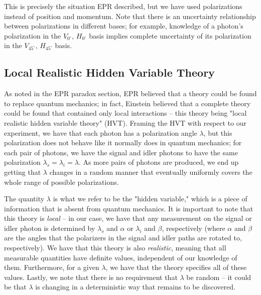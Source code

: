 \documentclass[twocolumn,amsmath,amssymb,pra]{revtex4-2}
\begin{document}
This is precisely the situation EPR described, but we have used polarizations instead of position and momentum. Note that there is an uncertainty relationship between polarizations in different bases; for example, knowledge of a photon's polarization in the $V_{0^{\circ}}$, $H_{0^{\circ}}$ basis implies complete uncertainty of its polarization in the $V_{45^{\circ}}$, $H_{45^{\circ}}$ basis.

\subsection{Local Realistic Hidden Variable Theory}
As noted in the EPR paradox section, EPR believed that a theory could be found to replace quantum mechanics; in fact, Einstein believed that a complete theory could be found that contained only local interactions -- this theory being "local realistic hidden variable theory" (HVT). Framing the HVT with respect to our experiment, we have that each photon has a polarization angle $\lambda$, but this polarization does not behave like it normally does in quantum mechanics; for each pair of photons, we have the signal and idler photons to have the same polarization $\lambda_{s} = \lambda_{i} = \lambda$. As more pairs of photons are produced, we end up getting that $\lambda$ changes in a random manner that eventually uniformly covers the whole range of possible polarizations.

The quantity $\lambda$ is what we refer to be the "hidden variable," which is a piece of information that is absent from quantum mechanics. It is important to note that this theory is \textit{local} -- in our case, we have that any measurement on the signal or idler photon is determined by $\lambda_{s}$ and $\alpha$ or $\lambda_{i}$ and $\beta$, respectively (where $\alpha$ and $\beta$ are the angles that the polarizers in the signal and idler paths are rotated to, respectively). We have that this theory is also \textit{realistic}, meaning that all measurable quantities have definite values, independent of our knowledge of them. Furthermore, for a given $\lambda$, we have that the theory specifies all of these values. Lastly, we note that there is no requirement that $\lambda$ be random -- it could be that $\lambda$ is changing in a deterministic way that remains to be discovered.
\end{document}
